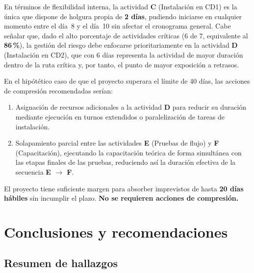 \documentclass[12pt,a4paper]{article}
\begin{document}
En t\'{e}rminos de flexibilidad interna, la actividad \textbf{C} (Instalaci\'{o}n en 
CD1) es la \'{u}nica que dispone de holgura propia de \textbf{2 d\'{i}as}, pudiendo 
iniciarse en cualquier momento entre el d\'{i}a~8 y el d\'{i}a~10 sin afectar el 
cronograma general. Cabe se\~{n}alar que, dado el alto porcentaje de actividades 
cr\'{i}ticas (6 de 7, equivalente al \textbf{86\,\%}), la gesti\'{o}n del riesgo debe 
enfocarse prioritariamente en la actividad \textbf{D} (Instalaci\'{o}n en CD2), que 
con 6 d\'{i}as representa la actividad de mayor duraci\'{o}n dentro de la ruta 
cr\'{i}tica y, por tanto, el punto de mayor exposici\'{o}n a retrasos.

En el hip\'{o}tético caso de que el proyecto superara el l\'{i}mite de 40 d\'{i}as, 
las acciones de compresi\'{o}n recomendadas ser\'{i}an:
\begin{enumerate}
  \item Asignaci\'{o}n de recursos adicionales a la actividad \textbf{D} para reducir 
  su duraci\'{o}n mediante ejecuci\'{o}n en turnos extendidos o paralelizaci\'{o}n de 
  tareas de instalaci\'{o}n.
  \item Solapamiento parcial entre las actividades \textbf{E} (Pruebas de flujo) y 
  \textbf{F} (Capacitaci\'{o}n), ejecutando la capacitaci\'{o}n te\'{o}rica de forma 
  simult\'{a}nea con las etapas finales de las pruebas, reduciendo as\'{i} la 
  duraci\'{o}n efectiva de la secuencia \textbf{E $\to$ F}.
\end{enumerate}

\begin{cajares}
El proyecto tiene suficiente margen para absorber imprevistos de hasta \textbf{20 
d\'{i}as h\'{a}biles} sin incumplir el plazo. \textbf{No se requieren acciones de 
compresi\'{o}n.}
\end{cajares}


\newpage

\section{Conclusiones y recomendaciones}

\subsection{Resumen de hallazgos}
\end{document}
